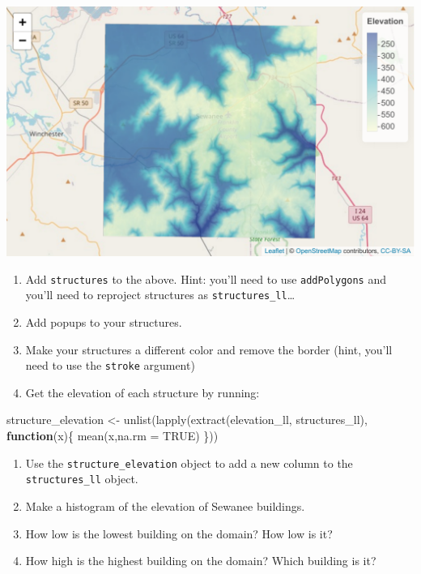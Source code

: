 \documentclass[
]{book}
\newenvironment{Shaded}{\begin{snugshade}}{\end{snugshade}}
\newcommand{\AttributeTok}[1]{\textcolor[rgb]{0.77,0.63,0.00}{#1}}
\newcommand{\ConstantTok}[1]{\textcolor[rgb]{0.00,0.00,0.00}{#1}}
\newcommand{\ControlFlowTok}[1]{\textcolor[rgb]{0.13,0.29,0.53}{\textbf{#1}}}
\newcommand{\FunctionTok}[1]{\textcolor[rgb]{0.00,0.00,0.00}{#1}}
\newcommand{\NormalTok}[1]{#1}
\newcommand{\OtherTok}[1]{\textcolor[rgb]{0.56,0.35,0.01}{#1}}
\begin{document}
\includegraphics{figures/unnamed-chunk-441-1.pdf}

\begin{enumerate}
\def\labelenumi{\arabic{enumi}.}
\setcounter{enumi}{35}
\item
  Add \texttt{structures} to the above. Hint: you'll need to use \texttt{addPolygons} and you'll need to reproject structures as \texttt{structures\_ll}\ldots{}
\item
  Add popups to your structures.
\item
  Make your structures a different color and remove the border (hint, you'll need to use the \texttt{stroke} argument)
\item
  Get the elevation of each structure by running:
\end{enumerate}

\begin{Shaded}
\begin{Highlighting}[]
\NormalTok{structure\_elevation }\OtherTok{\textless{}{-}} 
  \FunctionTok{unlist}\NormalTok{(}\FunctionTok{lapply}\NormalTok{(}\FunctionTok{extract}\NormalTok{(elevation\_ll, structures\_ll),}
         \ControlFlowTok{function}\NormalTok{(x)\{}
           \FunctionTok{mean}\NormalTok{(x,}\AttributeTok{na.rm =} \ConstantTok{TRUE}\NormalTok{)}
\NormalTok{         \}))}
\end{Highlighting}
\end{Shaded}

\begin{enumerate}
\def\labelenumi{\arabic{enumi}.}
\setcounter{enumi}{39}
\item
  Use the \texttt{structure\_elevation} object to add a new column to the \texttt{structures\_ll} object.
\item
  Make a histogram of the elevation of Sewanee buildings.
\item
  How low is the lowest building on the domain? How low is it?
\item
  How high is the highest building on the domain? Which building is it?
\end{enumerate}
\end{document}
